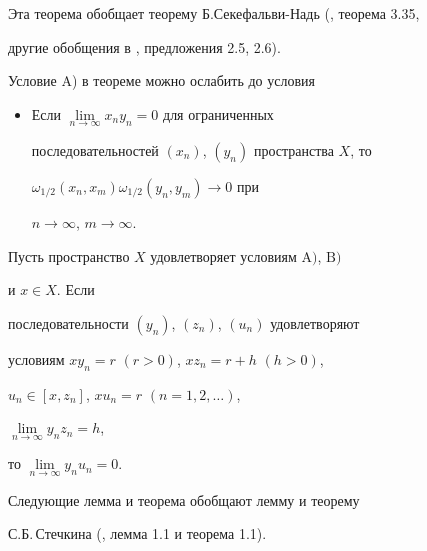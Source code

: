 \begin{note}


Эта теорема обобщает теорему Б.Секефальви-Надь (\cite{Bru}, теорема 3.35,


другие обобщения в \cite{Vla}, предложения 2.5, 2.6).


\end{note}





\begin{note}


Условие A) в теореме можно ослабить до условия


\begin{itemize}


\item[A$')$] Если $\lim\limits_{n \to \infty}{x_{n}y_{n}}=0$ для ограниченных


последовательностей $(x_{n})$, $(y_{n})$ пространства $X$, то 


$\omega_{1/2}(x_{n},x_{m})\omega_{1/2}(y_{n},y_{m}) \to 0$ при 


$n \to \infty$, $m \to \infty$.


\end{itemize}


\end{note}





\begin{lem}


Пусть пространство $X$ удовлетворяет условиям $\mathrm A)$, $\mathrm B)$


и $x \in X$. Если


последовательности $(y_{n})$, $(z_{n})$, $(u_{n})$ удовлетворяют


условиям $xy_{n} = r$ $(r>0)$, $xz_{n} = r + h$ $(h>0)$, 


$u_{n} \in [x,z_{n}]$, $xu_{n} = r$ $(n = 1,2,\dotsc)$,


$\lim\limits_{n \to \infty}{y_{n}z_{n}} =h$, 


то $\lim\limits_{n \to \infty}{y_{n}u_{n}} = 0$.


\end{lem}





Следующие лемма и теорема обобщают лемму и теорему


С.Б.\,Стечкина (\cite{Vla}, лемма 1.1 и теорема 1.1).





